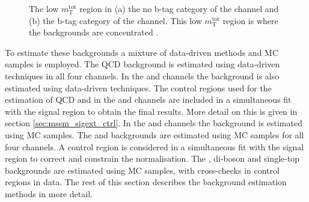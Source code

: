 \begin{figure}[h!]
\begin{center}
\end{center}
\caption{The low $m_{\text{T}}^{\text{tot}}$ region in (a) the 
no b-tag category of the \mutau channel and (b) the b-tag category of the \emu channel.
This low $m_{\text{T}}^{\text{tot}}$ region is where the backgrounds
are concentrated \cite{CMS-PAS-HIG-16-037-addit}.}
\label{fig:mssm_bkgs_overview}
\end{figure}

To estimate these backgrounds a mixture of data-driven 
methods and \ac{MC} samples is employed. The QCD background
is estimated using data-driven techniques in all four channels.
In the \mutau and \etau channels the \Wjets background is also
estimated using data-driven techniques. The control regions used
for the estimation of QCD and \Wjets in the \etau and \mutau channels
are included in a simultaneous fit with the signal region to obtain
the final results. More detail on this is given in section \ref{sec:mssm_sigext_ctrl}.
In the \emu and \tautau channels the \Wjets background is estimated using
\ac{MC} samples. The \Ztautau and \Zellell backgrounds are estimated
using \ac{MC} samples for all four channels. A \Zmm control region
is considered in a simultaneous fit with the signal region to correct and
constrain the \Ztautau normalisation.
The \ttbar, di-boson and single-top backgrounds are estimated
using \ac{MC} samples, with cross-checks in control regions in data.
The rest of this section describes the background estimation methods
in more detail.

